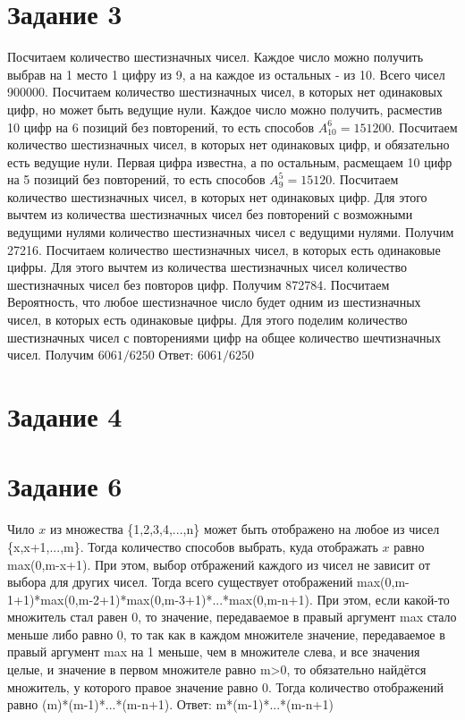 \documentclass[a4paper, 12pt]{article}
\begin{document}
	\section*{Задание 3}
		Посчитаем количество шестизначных чисел. Каждое число можно получить выбрав на 1 место 1 цифру из 9, а на каждое из остальных - из 10. Всего чисел 900000.
		Посчитаем количество шестизначных чисел, в которых нет одинаковых цифр, но может быть ведущие нули. Каждое число можно получить, расместив 10 цифр на 6 позиций без повторений, то есть способов $A_10^6=151200$.
		Посчитаем количество шестизначных чисел, в которых нет одинаковых цифр, и обязательно есть ведущие нули. Первая цифра известна, а по остальным, расмещаем 10 цифр на 5 позиций без повторений, то есть способов $A_9^5=15120$.
		Посчитаем количество шестизначных чисел, в которых нет одинаковых цифр. Для этого вычтем из количества шестизначных чисел без повторений с возможными ведущими нулями количество шестизначных чисел с ведущими нулями. Получим 27216.
		Посчитаем количество шестизначных чисел, в которых есть одинаковые цифры. Для этого вычтем из количества шестизначных чисел количество шестизначных чисел без повторов цифр. Получим 872784.
		Посчитаем Вероятность, что любое шестизначное число будет одним из шестизначных чисел, в которых есть одинаковые цифры. Для этого поделим количество шестизначных чисел с повторениями цифр на общее количество шечтизначных чисел. Получим $6061/6250$
		Ответ: $6061/6250$
	\section*{Задание 4}
	\section*{Задание 6}
		Чило $x$ из множества \{1,2,3,4,...,n\} может быть отображено на любое из чисел \{x,x+1,...,m\}. Тогда количество способов выбрать, куда отображать $x$ равно max(0,m-x+1). При этом, выбор отбражений каждого из чисел не зависит от выбора для других чисел. Тогда всего существует отображений max(0,m-1+1)*max(0,m-2+1)*max(0,m-3+1)*...*max(0,m-n+1). При этом, если какой-то множитель стал равен 0, то значение, передаваемое в правый аргумент max стало меньше либо равно 0, то так как в каждом множителе значение, передаваемое в правый аргумент max на 1 меньше, чем в множителе слева, и все значения целые, и значение в первом множителе равно m>0, то обязательно найдётся множитель, у которого правое значение равно 0. Тогда количество отображений равно (m)*(m-1)*...*(m-n+1).
		Ответ: m*(m-1)*...*(m-n+1)
\end{document}
